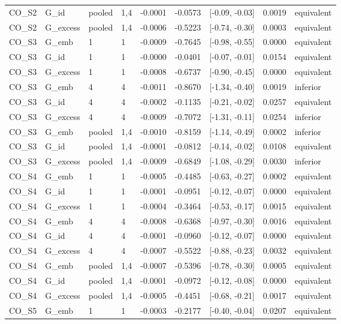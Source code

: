 \begin{tabular}{llllrrlrl}
CO\_S2 & G\_id & pooled & 1,4 & -0.0001 & -0.0573 & [-0.09, -0.03] & 0.0019 & equivalent \\
CO\_S2 & G\_excess & pooled & 1,4 & -0.0006 & -0.5223 & [-0.74, -0.30] & 0.0003 & equivalent \\
CO\_S3 & G\_emb & 1 & 1 & -0.0009 & -0.7645 & [-0.98, -0.55] & 0.0000 & equivalent \\
CO\_S3 & G\_id & 1 & 1 & -0.0000 & -0.0401 & [-0.07, -0.01] & 0.0154 & equivalent \\
CO\_S3 & G\_excess & 1 & 1 & -0.0008 & -0.6737 & [-0.90, -0.45] & 0.0000 & equivalent \\
CO\_S3 & G\_emb & 4 & 4 & -0.0011 & -0.8670 & [-1.34, -0.40] & 0.0019 & inferior \\
CO\_S3 & G\_id & 4 & 4 & -0.0002 & -0.1135 & [-0.21, -0.02] & 0.0257 & equivalent \\
CO\_S3 & G\_excess & 4 & 4 & -0.0009 & -0.7072 & [-1.31, -0.11] & 0.0254 & inferior \\
CO\_S3 & G\_emb & pooled & 1,4 & -0.0010 & -0.8159 & [-1.14, -0.49] & 0.0002 & inferior \\
CO\_S3 & G\_id & pooled & 1,4 & -0.0001 & -0.0812 & [-0.14, -0.02] & 0.0108 & equivalent \\
CO\_S3 & G\_excess & pooled & 1,4 & -0.0009 & -0.6849 & [-1.08, -0.29] & 0.0030 & inferior \\
CO\_S4 & G\_emb & 1 & 1 & -0.0005 & -0.4485 & [-0.63, -0.27] & 0.0002 & equivalent \\
CO\_S4 & G\_id & 1 & 1 & -0.0001 & -0.0951 & [-0.12, -0.07] & 0.0000 & equivalent \\
CO\_S4 & G\_excess & 1 & 1 & -0.0004 & -0.3464 & [-0.53, -0.17] & 0.0015 & equivalent \\
CO\_S4 & G\_emb & 4 & 4 & -0.0008 & -0.6368 & [-0.97, -0.30] & 0.0016 & equivalent \\
CO\_S4 & G\_id & 4 & 4 & -0.0001 & -0.0960 & [-0.12, -0.07] & 0.0000 & equivalent \\
CO\_S4 & G\_excess & 4 & 4 & -0.0007 & -0.5522 & [-0.88, -0.23] & 0.0032 & equivalent \\
CO\_S4 & G\_emb & pooled & 1,4 & -0.0007 & -0.5396 & [-0.78, -0.30] & 0.0005 & equivalent \\
CO\_S4 & G\_id & pooled & 1,4 & -0.0001 & -0.0972 & [-0.12, -0.08] & 0.0000 & equivalent \\
CO\_S4 & G\_excess & pooled & 1,4 & -0.0005 & -0.4451 & [-0.68, -0.21] & 0.0017 & equivalent \\
CO\_S5 & G\_emb & 1 & 1 & -0.0003 & -0.2177 & [-0.40, -0.04] & 0.0207 & equivalent \\

\end{tabular}
